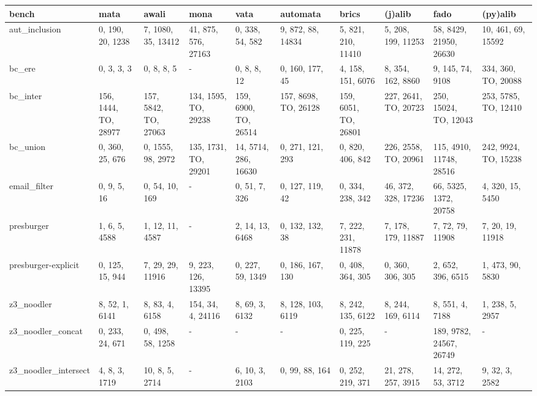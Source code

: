 \begin{tabular}{llllllllll}
\hline
 bench                & mata                 & awali                & mona                 & vata                 & automata             & brics                & (j)alib              & fado                    & (py)alib             \\
\hline
 aut_inclusion        & 0, 190, 20, 1238     & 7, 1080, 35, 13412   & 41, 875, 576, 27163  & 0, 338, 54, 582      & 9, 872, 88, 14834    & 5, 821, 210, 11410   & 5, 208, 199, 11253   & 58, 8429, 21950, 26630  & 10, 461, 69, 15592   \\
 bc_ere               & 0, 3, 3, 3           & 0, 8, 8, 5           & -                    & 0, 8, 8, 12          & 0, 160, 177, 45      & 4, 158, 151, 6076    & 8, 354, 162, 8860    & 9, 145, 74, 9108        & 334, 360, TO, 20088  \\
 bc_inter             & 156, 1444, TO, 28977 & 157, 5842, TO, 27063 & 134, 1595, TO, 29238 & 159, 6900, TO, 26514 & 157, 8698, TO, 26128 & 159, 6051, TO, 26801 & 227, 2641, TO, 20723 & 250, 15024, TO, 12043   & 253, 5785, TO, 12410 \\
 bc_union             & 0, 360, 25, 676      & 0, 1555, 98, 2972    & 135, 1731, TO, 29201 & 14, 5714, 286, 16630 & 0, 271, 121, 293     & 0, 820, 406, 842     & 226, 2558, TO, 20961 & 115, 4910, 11748, 28516 & 242, 9924, TO, 15238 \\
 email_filter         & 0, 9, 5, 16          & 0, 54, 10, 169       & -                    & 0, 51, 7, 326        & 0, 127, 119, 42      & 0, 334, 238, 342     & 46, 372, 328, 17236  & 66, 5325, 1372, 20758   & 4, 320, 15, 5450     \\
 presburger           & 1, 6, 5, 4588        & 1, 12, 11, 4587      & -                    & 2, 14, 13, 6468      & 0, 132, 132, 38      & 7, 222, 231, 11878   & 7, 178, 179, 11887   & 7, 72, 79, 11908        & 7, 20, 19, 11918     \\
 presburger-explicit  & 0, 125, 15, 944      & 7, 29, 29, 11916     & 9, 223, 126, 13395   & 0, 227, 59, 1349     & 0, 186, 167, 130     & 0, 408, 364, 305     & 0, 360, 306, 305     & 2, 652, 396, 6515       & 1, 473, 90, 5830     \\
 z3_noodler           & 8, 52, 1, 6141       & 8, 83, 4, 6158       & 154, 34, 4, 24116    & 8, 69, 3, 6132       & 8, 128, 103, 6119    & 8, 242, 135, 6122    & 8, 244, 169, 6114    & 8, 551, 4, 7188         & 1, 238, 5, 2957      \\
 z3_noodler_concat    & 0, 233, 24, 671      & 0, 498, 58, 1258     & -                    & -                    & -                    & 0, 225, 119, 225     & -                    & 189, 9782, 24567, 26749 & -                    \\
 z3_noodler_intersect & 4, 8, 3, 1719        & 10, 8, 5, 2714       & -                    & 6, 10, 3, 2103       & 0, 99, 88, 164       & 0, 252, 219, 371     & 21, 278, 257, 3915   & 14, 272, 53, 3712       & 9, 32, 3, 2582       \\
\hline
\end{tabular}